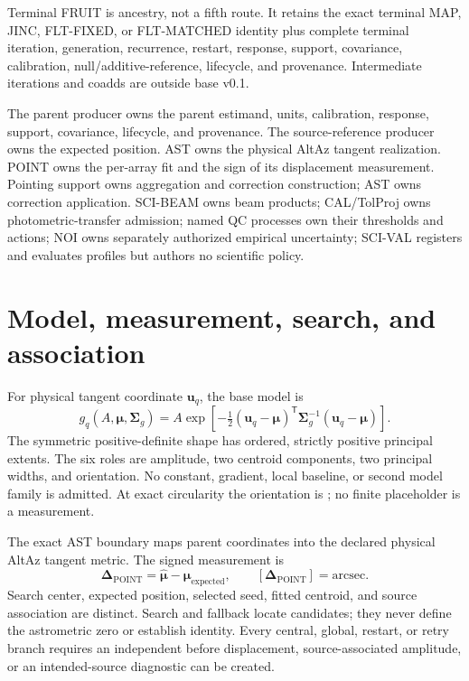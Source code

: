 \documentclass[12pt]{article}
\newcommand{\DeltaPoint}{\boldsymbol{\Delta}_{\mathrm{POINT}}}
\newcommand{\muhat}{\widehat{\boldsymbol{\mu}}}
\newcommand{\muexp}{\boldsymbol{\mu}_{\mathrm{expected}}}
\newcommand{\Sigmashape}{\boldsymbol{\Sigma}_{g}}
\begin{document}
Terminal FRUIT is ancestry, not a fifth route. It retains the exact terminal
MAP, JINC, FLT-FIXED, or FLT-MATCHED identity plus complete terminal iteration,
generation, recurrence, restart, response, support, covariance, calibration,
null/additive-reference, lifecycle, and provenance. Intermediate iterations
and coadds are outside base v0.1.

The parent producer owns the parent estimand, units, calibration, response,
support, covariance, lifecycle, and provenance. The source-reference producer
owns the expected position. AST owns the physical AltAz tangent realization.
POINT owns the per-array fit and the sign of its displacement measurement.
Pointing support owns aggregation and correction construction; AST owns
correction application. SCI-BEAM owns beam products; CAL/TolProj owns
photometric-transfer admission; named QC processes own their thresholds and
actions; NOI owns separately authorized empirical uncertainty; SCI-VAL
registers and evaluates profiles but authors no scientific policy.

\section{Model, measurement, search, and association}

For physical tangent coordinate $\boldsymbol{u}_q$, the base model is
\begin{equation}
g_q(A,\boldsymbol{\mu},\Sigmashape)
=A\exp\!\left[-\tfrac12(\boldsymbol{u}_q-\boldsymbol{\mu})^{\mathsf T}
\Sigmashape^{-1}(\boldsymbol{u}_q-\boldsymbol{\mu})\right].
\end{equation}
The symmetric positive-definite shape has ordered, strictly positive principal
extents. The six roles are amplitude, two centroid components, two principal
widths, and orientation. No constant, gradient, local baseline, or second
model family is admitted. At exact circularity the orientation is
; no finite placeholder is a measurement.

The exact AST boundary maps parent coordinates into the declared physical
AltAz tangent metric. The signed measurement is
\begin{equation}
\DeltaPoint=\muhat-\muexp,
\qquad [\DeltaPoint]=\mathrm{arcsec}.
\end{equation}
Search center, expected position, selected seed, fitted centroid, and source
association are distinct. Search and fallback locate candidates; they never
define the astrometric zero or establish identity. Every central, global,
restart, or retry branch requires an independent
 before displacement,
source-associated amplitude, or an intended-source diagnostic can be created.
\end{document}
